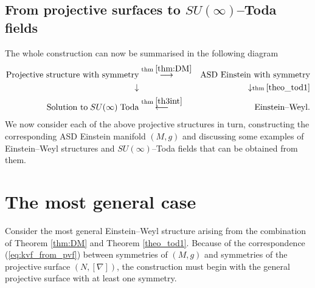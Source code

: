 \subsection{From projective surfaces to $SU(\infty)$--Toda fields}
The whole construction can now be summarised in the following diagram
\begin{eqnarray}
\label{diagram}
\text{Projective structure with symmetry} &\overset{\text{thm}\;\ref{thm:DM}}
{\longrightarrow}& \text{ASD Einstein with symmetry}\nonumber\\
\downarrow & & \downarrow \scriptstyle{\text{thm}\;\ref{theo_tod1}}\\
\text{Solution to}\;SU(\infty)\; \text{Toda} &\overset{\text{thm}\;\ref{th3int}}\longleftarrow&\text{Einstein--Weyl.}\nonumber
\end{eqnarray}
We now consider each of the above projective structures in turn, constructing the corresponding ASD Einstein manifold $(M,g)$ and discussing some examples of Einstein--Weyl structures and $SU(\infty)$--Toda fields that can be obtained from them.


\section{The most general case}
\label{general}

Consider the most general Einstein--Weyl structure arising from the combination
of Theorem \ref{thm:DM} and Theorem \ref{theo_tod1}. Because of the correspondence (\ref{eq:kvf_from_pvf}) between symmetries of $(M, g)$ and symmetries of the projective surface $(N, [\nabla])$, the construction must begin with the general projective surface with at least one symmetry. 
 
